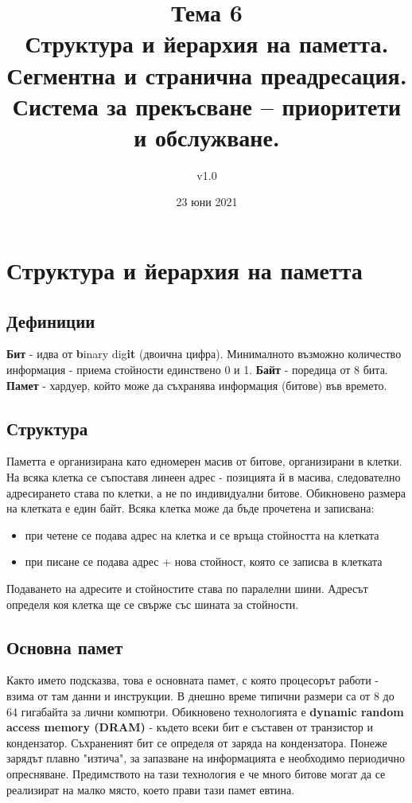 \documentclass[fleqn,12pt]{article}
\title{Тема 6\\ Структура и йерархия на паметта. Сегментна и странична преадресация.
Система за прекъсване – приоритети и обслужване.}
\author{v1.0}
\date{23 юни 2021}
\begin{document}
\maketitle

\tableofcontents

\section{Структура и йерархия на паметта}

\subsection{Дефиниции}
\textbf{Бит} - идва от \textbf{b}inary dig\textbf{it} (двоична цифра). Минималното възможно количество информация - приема стойности единствено 0 и 1.
\textbf{Байт} - поредица от 8 бита.
\textbf{Памет} - хардуер, който може да съхранява информация (битове) във времето.

\subsection{Структура}
Паметта е организирана като едномерен масив от битове, организирани в клетки. На всяка клетка се съпоставя линеен адрес - позицията й в масива, 
следователно адресирането става по клетки, а не по индивидуални битове. Обикновено размера на клетката е един байт.
Всяка клетка може да бъде прочетена и записвана:
\begin{itemize}
    \item при четене се подава адрес на клетка и се връща стойността на клетката
    \item при писане се подава адрес + нова стойност, която се записва в клетката
\end{itemize}

Подаването на адресите и стойностите става по паралелни шини. Адресът определя коя клетка ще се свърже със шината за стойности.

\subsection{Основна памет}
Както името подсказва, това е основната памет, с която процесорът работи - взима от там данни и инструкции. 
В днешно време типични размери са от 8 до 64 гигабайта за лични компютри.
Обикновено технологията е \textbf{dynamic random access memory (DRAM)} - където всеки бит е съставен от транзистор и кондензатор.
Съхраненият бит се определя от заряда на кондензатора. Понеже зарядът плавно "изтича", за запазване на информацията е необходимо
периодично опресняване. Предимството на тази технология е че много битове могат да се реализират на малко място, което прави тази памет евтина.
\end{document}

